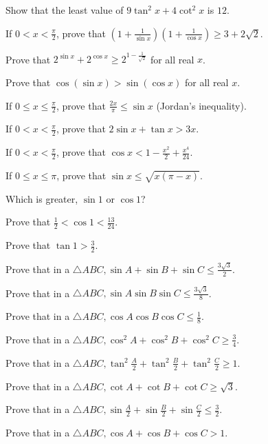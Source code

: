 \item Show that the least value of $9\tan^2x + 4\cot^2x$ is $12$.
\item If $0 < x < \frac{\pi}{2}$, prove that $\left(1 + \frac{1}{\sin x}\right)\left(1 + \frac{1}{\cos
    x}\right)\geq 3 + 2\sqrt{2}$.
\item Prove that $2^{\sin x} + 2^{\cos x}\geq 2^{1 - \frac{1}{\sqrt{2}}}$ for all real $x$.
\item Prove that $\cos(\sin x) > \sin(\cos x)$ for all real $x$.
\item If $0\leq x\leq \frac{\pi}{2}$, prove that $\frac{2x}{\pi}\leq \sin x$ (Jordan's inequality).
\item If $0 < x < \frac{\pi}{2}$, prove that $2\sin x + \tan x > 3x$.
\item If $0 < x < \frac{\pi}{2}$, prove that $\cos x < 1 - \frac{x^2}{2} + \frac{x^4}{24}$.
\item If $0\leq x\leq \pi$, prove that $\sin x\leq \sqrt{x(\pi - x)}$.
\item Which is greater, $\sin1$ or $\cos1$?
\item Prove that $\frac{1}{2} < \cos1 < \frac{13}{24}$.
\item Prove that $\tan1 > \frac{3}{2}$.
\item Prove that in a $\triangle ABC, \sin A + \sin B + \sin C\leq \frac{3\sqrt{3}}{2}$.
\item Prove that in a $\triangle ABC, \sin A\sin B\sin C\leq \frac{3\sqrt{3}}{8}$.
\item Prove that in a $\triangle ABC, \cos A\cos B\cos C\leq \frac{1}{8}$.
\item Prove that in a $\triangle ABC, \cos^2A + \cos^2B + \cos^2C\geq \frac{3}{4}$.
\item Prove that in a $\triangle ABC, \tan^2\frac{A}{2} + \tan^2\frac{B}{2} + \tan^2\frac{C}{2}\geq 1$.
\item Prove that in a $\triangle ABC, \cot A + \cot B + \cot C\geq \sqrt{3}$.
\item Prove that in a $\triangle ABC, \sin\frac{A}{2} + \sin\frac{B}{2} + \sin\frac{C}{2}\leq \frac{3}{2}$.
\item Prove that in a $\triangle ABC, \cos A + \cos B + \cos C > 1$.
\stopitemize
